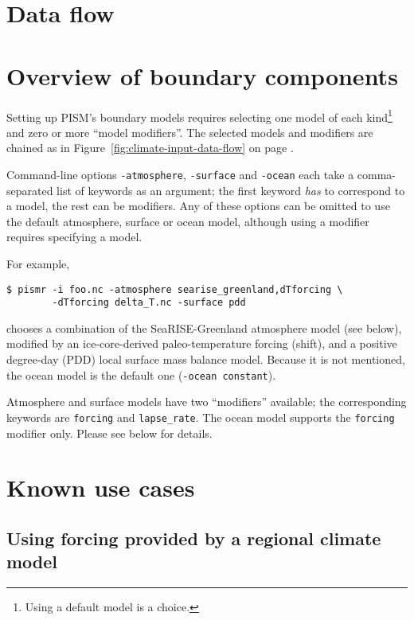 \documentclass[titlepage,letterpaper,final]{scrartcl}
\begin{document}
\section{Data flow}
\label{sec:data-flow}


\section{Overview of boundary components}
\label{sec:overview}

Setting up PISM's boundary models requires selecting one model of each kind\footnote{Using a default model is a choice.} and zero or more ``model modifiers''.  The selected models and modifiers are chained as in Figure~\ref{fig:climate-input-data-flow} on page \pageref{fig:climate-input-data-flow}.

Command-line options \texttt{-atmosphere}, \texttt{-surface} and \texttt{-ocean} each take a comma-separated list of keywords as an argument; the first keyword \emph{has} to correspond to a model, the rest can be modifiers. Any of these options can be omitted to use the default atmosphere, surface or ocean model, although using a modifier requires specifying a model.

For example,
\begin{verbatim}
$ pismr -i foo.nc -atmosphere searise_greenland,dTforcing \
        -dTforcing delta_T.nc -surface pdd
\end{verbatim}%
chooses a combination of the SeaRISE-Greenland atmosphere model (see below), modified by an ice-core-derived paleo-temperature forcing (shift), and a positive degree-day (PDD) local surface mass balance model.  Because it is not mentioned, the ocean model is the default one (\texttt{-ocean constant}).

Atmosphere and surface models have two ``modifiers'' available; the corresponding keywords are \texttt{forcing} and \texttt{lapse_rate}. The ocean model supports the \texttt{forcing} modifier only. Please see below for details.

\section{Known use cases}
\label{sec:known-use-cases}

\subsection{Using forcing provided by a regional climate model}
\label{sec:regional-model}
\end{document}
